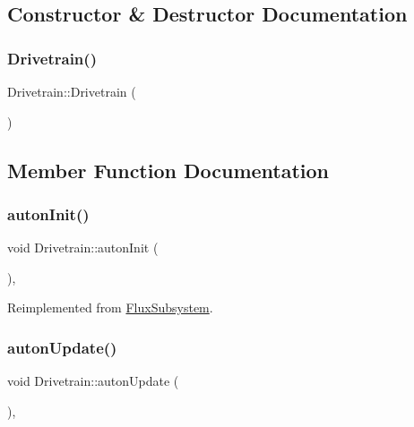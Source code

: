 \subsection{Constructor \& Destructor Documentation}
\mbox{\label{classDrivetrain_abfcc3eea7516b5f76422d39676adbd27}} 
\subsubsection{\texorpdfstring{Drivetrain()}{Drivetrain()}}
{\footnotesize\ttfamily Drivetrain\+::\+Drivetrain (\begin{DoxyParamCaption}{ }\end{DoxyParamCaption})}



\subsection{Member Function Documentation}
\mbox{\label{classDrivetrain_a6aec7fa1a9daf1233a59fe0243d3bc8c}} 
\subsubsection{\texorpdfstring{auton\+Init()}{autonInit()}}
{\footnotesize\ttfamily void Drivetrain\+::auton\+Init (\begin{DoxyParamCaption}{ }\end{DoxyParamCaption})\hspace{0.3cm}{\ttfamily [override]}, {\ttfamily [virtual]}}



Reimplemented from \hyperlink{classFluxSubsystem_a142cb34f612412e26bd0049e037dbe60}{Flux\+Subsystem}.

\mbox{\label{classDrivetrain_ab451b48c598fa715ff1a8117ddc6f705}} 
\subsubsection{\texorpdfstring{auton\+Update()}{autonUpdate()}}
{\footnotesize\ttfamily void Drivetrain\+::auton\+Update (\begin{DoxyParamCaption}{ }\end{DoxyParamCaption})\hspace{0.3cm}{\ttfamily [override]}, {\ttfamily [virtual]}}



